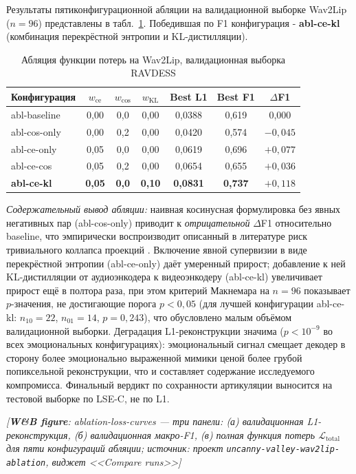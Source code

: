 \documentclass[a4paper, 12pt, oneside, openany]{article}
\begin{document}
Результаты пятиконфигурационной абляции на валидационной выборке Wav2Lip ($n=96$) представлены в табл.~\ref{tab:ablation}. Победившая по F1 конфигурация - \textbf{abl-ce-kl} (комбинация перекрёстной энтропии и KL-дистилляции).

\begin{table}[H]
\caption{Абляция функции потерь на Wav2Lip, валидационная выборка RAVDESS}
\label{tab:ablation}
\centering
\small
\begin{tabular}{|p{2.5cm}|c|c|c|c|c|c|}
\hline
\textbf{Конфигурация} & $w_{\text{ce}}$ & $w_{\cos}$ & $w_{\text{KL}}$ & \textbf{Best L1} & \textbf{Best F1} & $\Delta$F1 \\
\hline
abl-baseline & 0,00 & 0,0 & 0,00 & 0,0388 & 0,619 & 0,000 \\
\hline
abl-cos-only & 0,00 & 0,2 & 0,00 & 0,0420 & 0,574 & $-0,045$ \\
\hline
abl-ce-only & 0,05 & 0,0 & 0,00 & 0,0619 & 0,696 & $+0,077$ \\
\hline
abl-ce-cos & 0,05 & 0,2 & 0,00 & 0,0654 & 0,655 & $+0,036$ \\
\hline
\textbf{abl-ce-kl} & \textbf{0,05} & \textbf{0,0} & \textbf{0,10} & \textbf{0,0831} & \textbf{0,737} & \textbf{$+0,118$} \\
\hline
\end{tabular}
\end{table}

\textit{Содержательный вывод абляции:} наивная косинусная формулировка без явных негативных пар (abl-cos-only) приводит к \textit{отрицательной} $\Delta$F1 относительно baseline, что эмпирически воспроизводит описанный в литературе риск тривиального коллапса проекций \cite{chen2021simsiam}. Включение явной супервизии в виде перекрёстной энтропии (abl-ce-only) даёт умеренный прирост; добавление к ней KL-дистилляции от аудиоэнкодера к видеоэнкодеру (abl-ce-kl) увеличивает прирост ещё в полтора раза, при этом критерий Макнемара на $n=96$ показывает $p$-значения, не достигающие порога $p<0{,}05$ (для лучшей конфигурации abl-ce-kl: $n_{10}=22$, $n_{01}=14$, $p = 0{,}243$), что обусловлено малым объёмом валидационной выборки. Деградация L1-реконструкции значима ($p < 10^{-9}$ во всех эмоциональных конфигурациях): эмоциональный сигнал смещает декодер в сторону более эмоционально выраженной мимики ценой более грубой попиксельной реконструкции, что и составляет содержание исследуемого компромисса. Финальный вердикт по сохранности артикуляции выносится на тестовой выборке по LSE-C, не по L1.

\begin{center}
\textit{[\textbf{W\&B figure}: ablation-loss-curves --- три панели: (а) валидационная L1-реконструкция, (б) валидационная макро-F1, (в) полная функция потерь $\mathcal{L}_{\text{total}}$ для пяти конфигураций абляции; источник: проект \texttt{uncanny-valley-wav2lip-ablation}, виджет <<Compare runs>>]}
\end{center}
\end{document}
